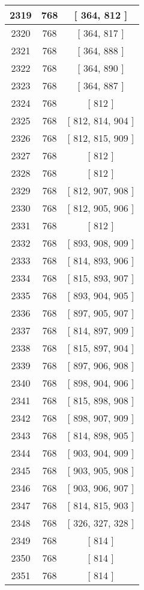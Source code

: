 \begin{center}
\begin{longtable}[H]{|| c c c ||}
\hline
2319 & 768 & [ 364, 812 ] \\ 
\hline
2320 & 768 & [ 364, 817 ] \\ 
\hline
2321 & 768 & [ 364, 888 ] \\ 
\hline
2322 & 768 & [ 364, 890 ] \\ 
\hline
2323 & 768 & [ 364, 887 ] \\ 
\hline
2324 & 768 & [ 812 ] \\ 
\hline
2325 & 768 & [ 812, 814, 904 ] \\ 
\hline
2326 & 768 & [ 812, 815, 909 ] \\ 
\hline
2327 & 768 & [ 812 ] \\ 
\hline
2328 & 768 & [ 812 ] \\ 
\hline
2329 & 768 & [ 812, 907, 908 ] \\ 
\hline
2330 & 768 & [ 812, 905, 906 ] \\ 
\hline
2331 & 768 & [ 812 ] \\ 
\hline
2332 & 768 & [ 893, 908, 909 ] \\ 
\hline
2333 & 768 & [ 814, 893, 906 ] \\ 
\hline
2334 & 768 & [ 815, 893, 907 ] \\ 
\hline
2335 & 768 & [ 893, 904, 905 ] \\ 
\hline
2336 & 768 & [ 897, 905, 907 ] \\ 
\hline
2337 & 768 & [ 814, 897, 909 ] \\ 
\hline
2338 & 768 & [ 815, 897, 904 ] \\ 
\hline
2339 & 768 & [ 897, 906, 908 ] \\ 
\hline
2340 & 768 & [ 898, 904, 906 ] \\ 
\hline
2341 & 768 & [ 815, 898, 908 ] \\ 
\hline
2342 & 768 & [ 898, 907, 909 ] \\ 
\hline
2343 & 768 & [ 814, 898, 905 ] \\ 
\hline
2344 & 768 & [ 903, 904, 909 ] \\ 
\hline
2345 & 768 & [ 903, 905, 908 ] \\ 
\hline
2346 & 768 & [ 903, 906, 907 ] \\ 
\hline
2347 & 768 & [ 814, 815, 903 ] \\ 
\hline
2348 & 768 & [ 326, 327, 328 ] \\ 
\hline
2349 & 768 & [ 814 ] \\ 
\hline
2350 & 768 & [ 814 ] \\ 
\hline
2351 & 768 & [ 814 ] \\ 

\end{longtable}
\end{center}
